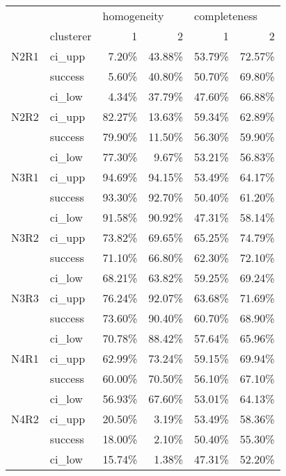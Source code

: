 \begin{tabular}{llrrrr}
\toprule
     & {} & \multicolumn{2}{l}{homogeneity} & \multicolumn{2}{l}{completeness} \\
     & clusterer &           1 &      2 &            1 &      2 \\
\midrule
N2R1 & ci\_upp &       7.20\% & 43.88\% &       53.79\% & 72.57\% \\
     & success &       5.60\% & 40.80\% &       50.70\% & 69.80\% \\
     & ci\_low &       4.34\% & 37.79\% &       47.60\% & 66.88\% \\
N2R2 & ci\_upp &      82.27\% & 13.63\% &       59.34\% & 62.89\% \\
     & success &      79.90\% & 11.50\% &       56.30\% & 59.90\% \\
     & ci\_low &      77.30\% &  9.67\% &       53.21\% & 56.83\% \\
N3R1 & ci\_upp &      94.69\% & 94.15\% &       53.49\% & 64.17\% \\
     & success &      93.30\% & 92.70\% &       50.40\% & 61.20\% \\
     & ci\_low &      91.58\% & 90.92\% &       47.31\% & 58.14\% \\
N3R2 & ci\_upp &      73.82\% & 69.65\% &       65.25\% & 74.79\% \\
     & success &      71.10\% & 66.80\% &       62.30\% & 72.10\% \\
     & ci\_low &      68.21\% & 63.82\% &       59.25\% & 69.24\% \\
N3R3 & ci\_upp &      76.24\% & 92.07\% &       63.68\% & 71.69\% \\
     & success &      73.60\% & 90.40\% &       60.70\% & 68.90\% \\
     & ci\_low &      70.78\% & 88.42\% &       57.64\% & 65.96\% \\
N4R1 & ci\_upp &      62.99\% & 73.24\% &       59.15\% & 69.94\% \\
     & success &      60.00\% & 70.50\% &       56.10\% & 67.10\% \\
     & ci\_low &      56.93\% & 67.60\% &       53.01\% & 64.13\% \\
N4R2 & ci\_upp &      20.50\% &  3.19\% &       53.49\% & 58.36\% \\
     & success &      18.00\% &  2.10\% &       50.40\% & 55.30\% \\
     & ci\_low &      15.74\% &  1.38\% &       47.31\% & 52.20\% \\

\end{tabular}
